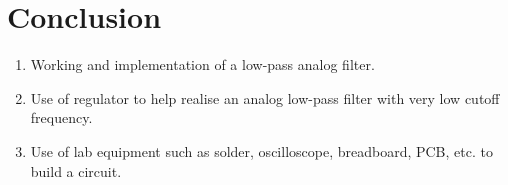 \documentclass[journal,12pt,twocolumn]{IEEEtran}
\begin{document}
\section{Conclusion}
\begin{enumerate}
    \item Working and implementation of a low-pass analog filter.
    \item Use of regulator to help realise an analog low-pass filter with
        very low cutoff frequency.
    \item Use of lab equipment such as solder, oscilloscope, breadboard, PCB, etc.
        to build a circuit.
\end{enumerate}
\end{document}
